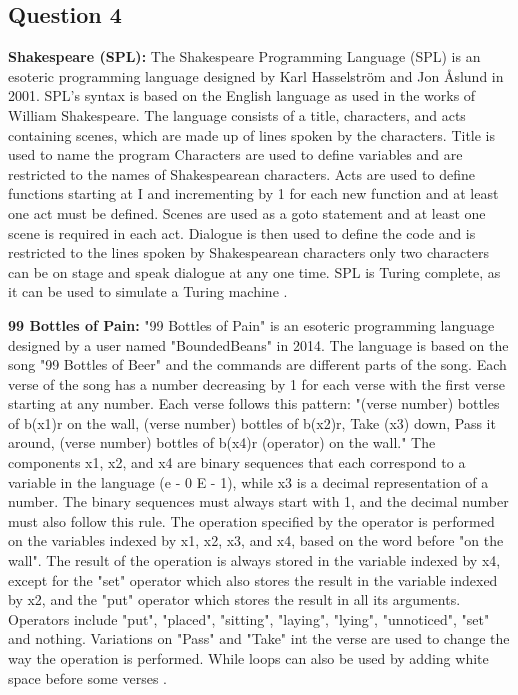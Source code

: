 \documentclass{article}
\begin{document}
\subsection*{Question 4}

\textbf{Shakespeare (SPL):} The Shakespeare Programming Language (SPL) is an esoteric programming language designed by Karl Hasselström and Jon Åslund in 2001. 
SPL's syntax is based on the English language as used in the works of William Shakespeare.
The language consists of a title, characters, and acts containing scenes, which are made up of lines spoken by the characters.
Title is used to name the program
Characters are used to define variables and are restricted to the names of Shakespearean characters.
Acts are used to define functions starting at I and incrementing by 1 for each new function and at least one act must be defined.
Scenes are used as a goto statement and at least one scene is required in each act.
Dialogue is then used to define the code and is restricted to the lines spoken by Shakespearean characters only two characters can be on stage and speak dialogue at any one time.
SPL is Turing complete, as it can be used to simulate a Turing machine \cite{esolangs2022shakespeare}.

\textbf{99 Bottles of Pain:} "99 Bottles of Pain" is an esoteric programming language designed by a user named "BoundedBeans" in 2014. 
The language is based on the song "99 Bottles of Beer" and the commands are different parts of the song. 
Each verse of the song has a number decreasing by 1 for each verse with the first verse starting at any number.
Each verse follows this pattern: "(verse number) bottles of b(x1)r on the wall, (verse number) bottles of b(x2)r, Take (x3) down, Pass it around, (verse number) bottles of b(x4)r (operator) on the wall."
The components x1, x2, and x4 are binary sequences that each correspond to a variable in the language (e - 0 E - 1), while x3 is a decimal representation of a number.
The binary sequences must always start with 1, and the decimal number must also follow this rule.
The operation specified by the operator is performed on the variables indexed by x1, x2, x3, and x4, based on the word before "on the wall".
The result of the operation is always stored in the variable indexed by x4, except for the "set" operator which also stores the result in the variable indexed by x2, and the "put" operator which stores the result in all its arguments.
Operators include "put", "placed", "sitting", "laying", "lying", "unnoticed", "set" and nothing.
Variations on "Pass" and "Take" int the verse are used to change the way the operation is performed.
While loops can also be used by adding white space before some verses \cite{esolangs202299bottles}.
\end{document}
